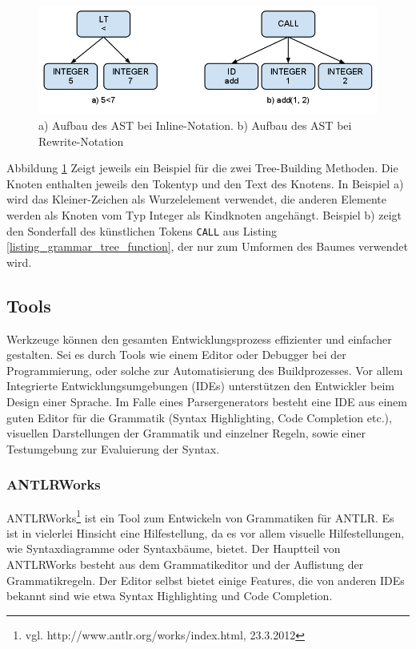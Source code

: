 \begin{figure}[h]
\includegraphics[scale=0.5]{figures/ast_beispiele}
\caption{a) Aufbau des AST bei Inline-Notation. b) Aufbau des AST bei Rewrite-Notation}
\label{abb_ast_beispiele}
\end{figure}

Abbildung \ref{abb_ast_beispiele} Zeigt jeweils ein Beispiel für die zwei Tree-Building Methoden. Die Knoten enthalten jeweils den Tokentyp und den Text des Knotens. In Beispiel a) wird das Kleiner-Zeichen als Wurzelelement verwendet, die anderen Elemente werden als Knoten vom Typ Integer als Kindknoten an\-ge\-hängt. Beispiel b) zeigt den Sonderfall des künstlichen Tokens \texttt{CALL} aus Listing \ref{listing_grammar_tree_function}, der nur zum Umformen des Baumes verwendet wird.


\subsection{Tools}
\label{tools_antlr_tools}

Werkzeuge können den gesamten Entwicklungsprozess effizienter und einfacher gestalten. Sei es durch Tools wie einem Editor oder Debugger bei der Programmierung, oder solche zur Automatisierung des Buildprozesses. Vor allem Integrierte Entwicklungsumgebungen (IDEs) unterstützen den Entwickler beim Design einer Sprache. Im Falle eines Parsergenerators besteht eine IDE aus einem guten Editor für die Grammatik (Syntax Highlighting, Code Completion etc.), visuellen Darstellungen der Grammatik und einzelner Regeln, sowie einer Testumgebung zur Eva\-lu\-ier\-ung der Syntax.

\subsubsection{ANTLRWorks}

ANTLRWorks\footnote{vgl. http://www.antlr.org/works/index.html, 23.3.2012} ist ein Tool zum Entwickeln von Grammatiken für ANTLR. Es ist in vielerlei Hinsicht eine Hilfestellung, da es vor allem visuelle Hilfestellungen, wie Syntaxdiagramme oder Syntaxbäume, bietet. Der Hauptteil von ANTLRWorks besteht aus dem Grammatikeditor und der Auflistung der Grammatikregeln. Der Editor selbst bietet einige Features, die von anderen IDEs bekannt sind wie etwa Syntax Highlighting und Code Completion.

